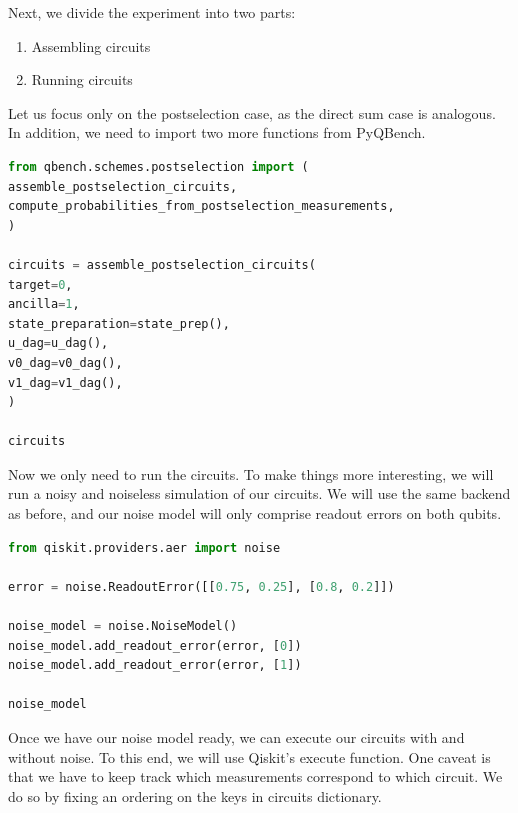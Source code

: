 \documentclass[preprint,12pt, a4paper, dvipsnames]{elsarticle}
\newcommand{\1}{{\rm 1\hspace{-0.9mm}l}}
\begin{document}
\pagebreak


Next, we divide the experiment into two parts:
\begin{enumerate}
	\item Assembling  circuits
	\item Running  circuits
\end{enumerate}


Let us focus only on the postselection case, as the direct sum case is analogous. In addition, we need to import two more functions from PyQBench.




\begin{lstlisting}[language=Python, caption=Assembling circuits]
from qbench.schemes.postselection import (
assemble_postselection_circuits,
compute_probabilities_from_postselection_measurements,
)

circuits = assemble_postselection_circuits(
target=0,
ancilla=1,
state_preparation=state_prep(),
u_dag=u_dag(),
v0_dag=v0_dag(),
v1_dag=v1_dag(),
)

circuits
\end{lstlisting}

%

Now we only need to run the circuits.
To make things more interesting, we will run a noisy and noiseless simulation of our circuits. We will use the same backend as before, and our noise model will only comprise readout errors on both qubits.

\begin{lstlisting}[language=Python, caption=Noise models]
from qiskit.providers.aer import noise

error = noise.ReadoutError([[0.75, 0.25], [0.8, 0.2]])

noise_model = noise.NoiseModel()
noise_model.add_readout_error(error, [0])
noise_model.add_readout_error(error, [1])

noise_model
\end{lstlisting}

Once we have our noise model ready, we can execute our circuits with and without noise. To this end, we will use Qiskit’s execute function. One caveat is that we have to keep track which measurements correspond to which circuit. We do so by fixing an ordering on the keys in circuits dictionary.
\end{document}
